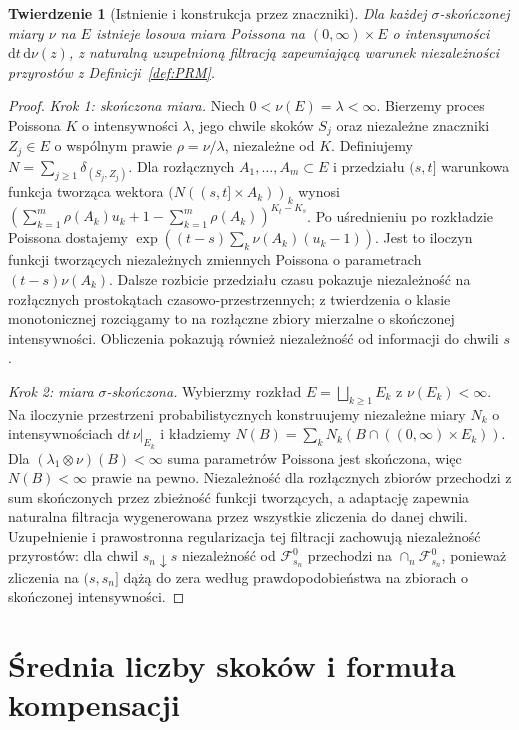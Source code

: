 \documentclass[11pt,a4paper,oneside]{report}
\numberwithin{equation}{chapter}
\theoremstyle{plain}
\newtheorem{twierdzenie}{Twierdzenie}[chapter]
\theoremstyle{definition}
\theoremstyle{remark}
\newcommand{\calF}{\mathcal{F}}
\newcommand{\dd}{\mathrm{d}}
\begin{document}
\begin{twierdzenie}[Istnienie i konstrukcja przez znaczniki]
\label{th:prm-existence}
Dla każdej $\sigma$-skończonej miary $\nu$ na $E$ istnieje
losowa miara Poissona na $(0,\infty)\times E$ o intensywności
$\dd t\,\dd\nu(z)$, z naturalną uzupełnioną filtracją
zapewniającą warunek niezależności przyrostów z
Definicji~\ref{def:PRM}.
\end{twierdzenie}
\begin{proof}
\emph{Krok 1: skończona miara.} Niech $0<\nu(E)=\lambda<\infty$.
Bierzemy proces Poissona $K$ o intensywności $\lambda$, jego
chwile skoków $S_j$ oraz niezależne znaczniki $Z_j\in E$ o
wspólnym prawie $\rho=\nu/\lambda$, niezależne od $K$.
Definiujemy $N=\sum_{j\ge1}\delta_{(S_j,Z_j)}$.
Dla rozłącznych $A_1,\ldots,A_m\subset E$ i przedziału
$(s,t]$ warunkowa funkcja tworząca wektora
$(N((s,t]\times A_k))_k$ wynosi
$(\sum_{k=1}^m\rho(A_k)u_k+1-\sum_{k=1}^m\rho(A_k))^{K_t-K_s}$.
Po uśrednieniu po rozkładzie Poissona dostajemy
$\exp((t-s)\sum_k\nu(A_k)(u_k-1))$.
Jest to iloczyn funkcji tworzących niezależnych zmiennych
Poissona o parametrach $(t-s)\nu(A_k)$.
Dalsze rozbicie przedziału czasu pokazuje niezależność na
rozłącznych prostokątach czasowo-przestrzennych; z twierdzenia
o klasie monotonicznej rozciągamy to na rozłączne zbiory
mierzalne o skończonej intensywności. Obliczenia pokazują
również niezależność od informacji do chwili $s$.

\emph{Krok 2: miara $\sigma$-skończona.} Wybierzmy rozkład
$E=\bigsqcup_{k\ge1}E_k$ z $\nu(E_k)<\infty$.
Na iloczynie przestrzeni probabilistycznych konstruujemy niezależne
miary $N_k$ o intensywnościach $\dd t\,\nu|_{E_k}$ i kładziemy
$N(B)=\sum_kN_k(B\cap((0,\infty)\times E_k))$.
Dla $(\lambda_1\otimes\nu)(B)<\infty$ suma parametrów Poissona
jest skończona, więc $N(B)<\infty$ prawie na pewno.
Niezależność dla rozłącznych zbiorów przechodzi z sum skończonych
przez zbieżność funkcji tworzących, a adaptację zapewnia naturalna
filtracja wygenerowana przez wszystkie zliczenia do danej chwili.
Uzupełnienie i prawostronna regularizacja tej filtracji zachowują
niezależność przyrostów: dla chwil $s_n\downarrow s$ niezależność
od $\calF^0_{s_n}$ przechodzi na $\cap_n\calF^0_{s_n}$, ponieważ
zliczenia na $(s,s_n]$ dążą do zera według prawdopodobieństwa
na zbiorach o skończonej intensywności.
\end{proof}

\section{Średnia liczby skoków i formuła kompensacji}
\end{document}
